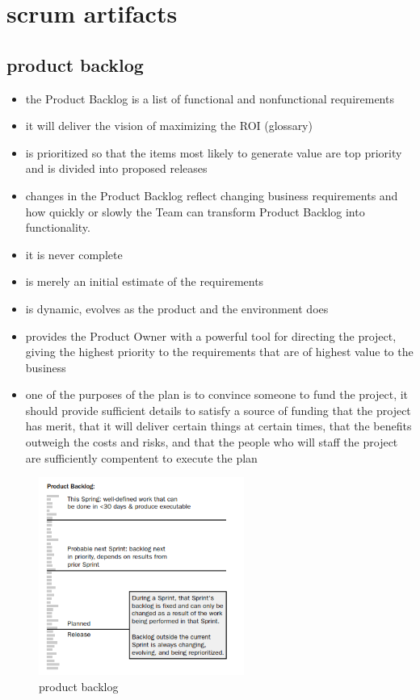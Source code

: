 \section{scrum artifacts}

\subsection{product backlog}
\begin{itemize}
  \item the Product Backlog is a list of functional and nonfunctional requirements
  \item it will deliver the vision of maximizing the ROI (glossary)
  \item is prioritized so that the items most likely to generate value are top priority and is divided into proposed releases
  \item changes in the Product Backlog reflect changing business requirements and how quickly or slowly the Team can transform Product Backlog into functionality.
  \item it is never complete
  \item is merely an initial estimate of the requirements
  \item is dynamic, evolves as the product and the environment does
  \item provides the Product Owner with a powerful tool for directing the project, giving the highest priority to the requirements that are of highest value to the business
  \item one of the purposes of the plan is to convince someone to fund the project, it should provide sufficient details to satisfy a source of funding that the project has merit, that it will deliver certain things at certain times, that the benefits outweigh the costs and risks, and that the people who will staff the project are sufficiently compentent to execute the plan
\end{itemize}

\begin{figure}[H]
  \centering
  \includegraphics[width=0.6\textwidth]{./figures/product_backlog.PNG}
  \caption{product backlog}
  \label{fig:product_backlog}
\end{figure}\bigskip


